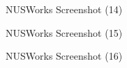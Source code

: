 \documentclass[fyp]{socreport}
\begin{document}
\begin{figure}
\caption{NUSWorks Screenshot (14)}
\label{screen-14}
\end{figure}

\begin{figure}
\caption{NUSWorks Screenshot (15)}
\label{screen-15}
\end{figure}

\begin{figure}
\caption{NUSWorks Screenshot (16)}
\label{screen-16}
\end{figure}
\end{document}
